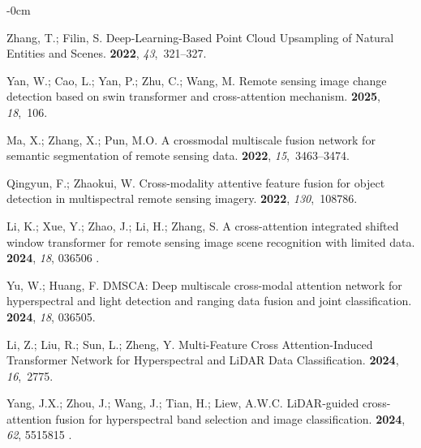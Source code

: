 \documentclass[remotesensing,article,accept,pdftex,moreauthors]{Definitions/mdpi}
\renewcommand{\hl}[1]{#1}
\begin{document}
\begin{adjustwidth}{-\extralength}{0cm}
\begin{thebibliography}{999}
Zhang, T.; Filin, S.
\newblock Deep-Learning-Based Point Cloud Upsampling of Natural Entities and
  Scenes.
 {\bf 2022}, {\em 43},~321--327.

Yan, W.; Cao, L.; Yan, P.; Zhu, C.; Wang, M.
\newblock Remote sensing image change detection based on swin transformer and
  cross-attention mechanism.
 {\bf 2025}, {\em 18},~106.

Ma, X.; Zhang, X.; Pun, M.O.
\newblock A crossmodal multiscale fusion network for semantic segmentation of
  remote sensing data.
 {\bf 2022}, {\em 15},~3463--3474.

Qingyun, F.; Zhaokui, W.
\newblock Cross-modality attentive feature fusion for object detection in
  multispectral remote sensing imagery.
 {\bf 2022}, {\em 130},~108786.

Li, K.; Xue, Y.; Zhao, J.; Li, H.; Zhang, S.
\newblock A cross-attention integrated shifted window transformer for remote
  sensing image scene recognition with limited data.
 {\bf 2024}, {\em
  18}, \hl{036506}%
.

Yu, W.; Huang, F.
\newblock DMSCA: Deep multiscale cross-modal attention network for
  hyperspectral and light detection and ranging data fusion and joint
  classification.
 {\bf 2024}, {\em
  18}, \hl{036505}.

Li, Z.; Liu, R.; Sun, L.; Zheng, Y.
\newblock Multi-Feature Cross Attention-Induced Transformer Network for
  Hyperspectral and LiDAR Data Classification.
 {\bf 2024}, {\em 16},~2775.

Yang, J.X.; Zhou, J.; Wang, J.; Tian, H.; Liew, A.W.C.
\newblock LiDAR-guided cross-attention fusion for hyperspectral band selection
  and image classification.
 {\bf 2024},
  {\em 62}, \hl{5515815}%
.


\end{thebibliography}
\end{adjustwidth}
\end{document}
